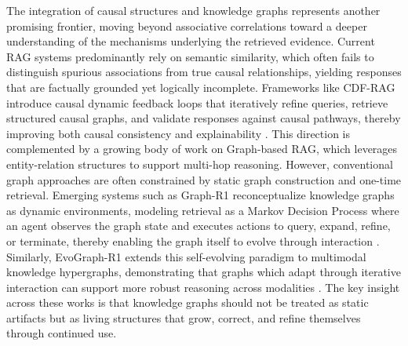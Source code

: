\documentclass[11pt]{article}
\begin{document}
The integration of causal structures and knowledge graphs represents another promising frontier, moving beyond associative correlations toward a deeper understanding of the mechanisms underlying the retrieved evidence. Current RAG systems predominantly rely on semantic similarity, which often fails to distinguish spurious associations from true causal relationships, yielding responses that are factually grounded yet logically incomplete. Frameworks like CDF-RAG introduce causal dynamic feedback loops that iteratively refine queries, retrieve structured causal graphs, and validate responses against causal pathways, thereby improving both causal consistency and explainability \cite{ref610}. This direction is complemented by a growing body of work on Graph-based RAG, which leverages entity-relation structures to support multi-hop reasoning. However, conventional graph approaches are often constrained by static graph construction and one-time retrieval. Emerging systems such as Graph-R1 reconceptualize knowledge graphs as dynamic environments, modeling retrieval as a Markov Decision Process where an agent observes the graph state and executes actions to query, expand, refine, or terminate, thereby enabling the graph itself to evolve through interaction \cite{ref306}. Similarly, EvoGraph-R1 extends this self-evolving paradigm to multimodal knowledge hypergraphs, demonstrating that graphs which adapt through iterative interaction can support more robust reasoning across modalities \cite{ref42}. The key insight across these works is that knowledge graphs should not be treated as static artifacts but as living structures that grow, correct, and refine themselves through continued use.
\end{document}
